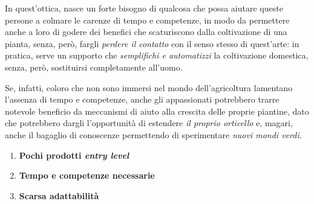 In quest'ottica, nasce un forte bisogno di qualcosa che possa aiutare queste persone a colmare le carenze di tempo e competenze, in modo da permettere anche a loro di godere dei benefici che scaturiscono dalla coltivazione di una pianta, senza, però, fargli \textit{perdere il contatto} con il senso stesso di quest'arte: in pratica, serve un supporto che \textit{semplifichi e automatizzi} la coltivazione domestica, senza, però, sostituirsi completamente all'uomo.

Se, infatti, coloro che non sono immersi nel mondo dell'agricoltura lamentano l'assenza di tempo e competenze, anche gli appassionati potrebbero trarre notevole beneficio da meccanismi di aiuto alla crescita delle proprie piantine, dato che potrebbero dargli l'opportunità di estendere \textit{il proprio orticello} e, magari, anche il bagaglio di conoscenze permettendo di sperimentare \textit{nuovi mondi verdi}.



\begin{enumerate}
	\item \textbf{Pochi prodotti \textit{entry level}}\\
	
	\item \textbf{Tempo e competenze necessarie}\\
	
	\item \textbf{Scarsa adattabilità}\\
\end{enumerate}
